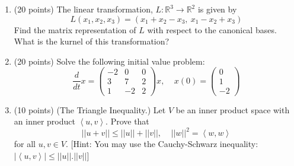 \documentclass[fleqn]{article}
\begin{document}
\begin{enumerate}


    \item (20 points) The linear transformation, $L:\mathbb{R}^3 \rightarrow \mathbb{R}^2$ is given by 
    $$
      L(x_1, x_2, x_3)=\left(x_1+x_2-x_3, ~ x_1-x_2+x_3\right)
    $$ 
    Find the matrix representation of $L$ with respect to the canonical bases. What is the kurnel
    of this transformation?

            

    \item (20 points) Solve the following initial value problem:
    $$
      \dfrac{d}{dt}x=\begin{pmatrix}
        -2 & 0 & 0
        \\
        3 & 7 & 2
        \\
        1 & -2 & 2
      \end{pmatrix}x, ~~~~~ x(0)=\begin{pmatrix}
        0
        \\
        1
        \\
        -2
      \end{pmatrix}
    $$

            


    \item (10 points) (The Triangle Inequality.) Let $V$ be an inner product space with an inner product
    $\left\langle u, v\right\rangle$. Prove that 
    $$
      ||u+v|| \leq ||u||+||v||, ~~~~~ ||w||^2=\left\langle w, w\right\rangle
    $$
    for all $u,v \in V$.  [Hint: You may use the Cauchy-Schwarz inequality: $|\left\langle u, v\right\rangle | \leq ||u||.||v||$]

          


  \end{enumerate}
\end{document}
